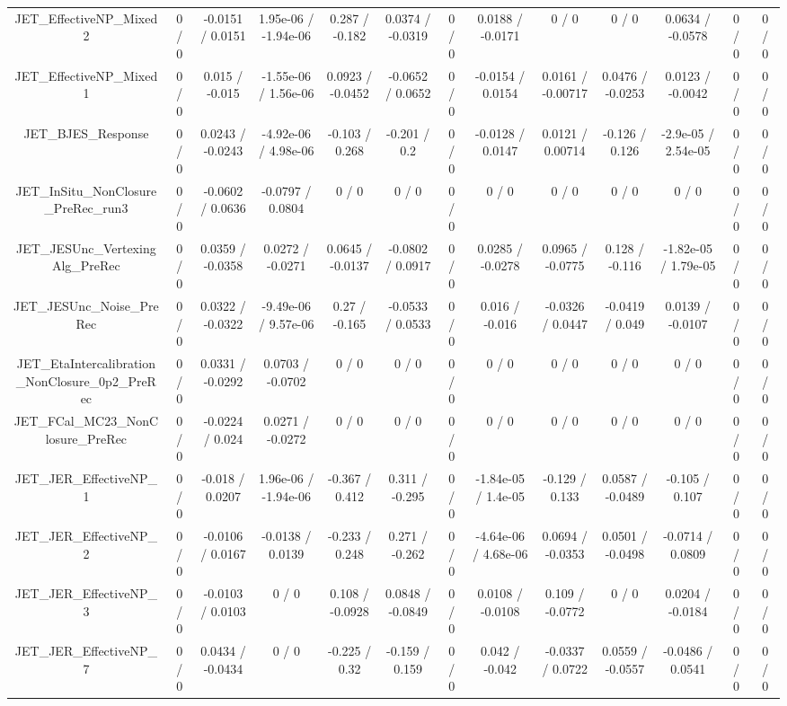 \documentclass[10pt]{article}
\begin{document}
\begin{table}[htbp]
\begin{center}
\begin{tabular}{|c|c|c|c|c|c|c|c|c|c|c|c|c|}
  JET_EffectiveNP_Mixed2 & 0 / 0 & -0.0151 / 0.0151 & 1.95e-06 / -1.94e-06 & 0.287 / -0.182 & 0.0374 / -0.0319 & 0 / 0 & 0.0188 / -0.0171 & 0 / 0 & 0 / 0 & 0.0634 / -0.0578 & 0 / 0 & 0 / 0 \\ 
  JET_EffectiveNP_Mixed1 & 0 / 0 & 0.015 / -0.015 & -1.55e-06 / 1.56e-06 & 0.0923 / -0.0452 & -0.0652 / 0.0652 & 0 / 0 & -0.0154 / 0.0154 & 0.0161 / -0.00717 & 0.0476 / -0.0253 & 0.0123 / -0.0042 & 0 / 0 & 0 / 0 \\ 
  JET_BJES_Response & 0 / 0 & 0.0243 / -0.0243 & -4.92e-06 / 4.98e-06 & -0.103 / 0.268 & -0.201 / 0.2 & 0 / 0 & -0.0128 / 0.0147 & 0.0121 / 0.00714 & -0.126 / 0.126 & -2.9e-05 / 2.54e-05 & 0 / 0 & 0 / 0 \\ 
  JET_InSitu_NonClosure_PreRec_run3 & 0 / 0 & -0.0602 / 0.0636 & -0.0797 / 0.0804 & 0 / 0 & 0 / 0 & 0 / 0 & 0 / 0 & 0 / 0 & 0 / 0 & 0 / 0 & 0 / 0 & 0 / 0 \\ 
  JET_JESUnc_VertexingAlg_PreRec & 0 / 0 & 0.0359 / -0.0358 & 0.0272 / -0.0271 & 0.0645 / -0.0137 & -0.0802 / 0.0917 & 0 / 0 & 0.0285 / -0.0278 & 0.0965 / -0.0775 & 0.128 / -0.116 & -1.82e-05 / 1.79e-05 & 0 / 0 & 0 / 0 \\ 
  JET_JESUnc_Noise_PreRec & 0 / 0 & 0.0322 / -0.0322 & -9.49e-06 / 9.57e-06 & 0.27 / -0.165 & -0.0533 / 0.0533 & 0 / 0 & 0.016 / -0.016 & -0.0326 / 0.0447 & -0.0419 / 0.049 & 0.0139 / -0.0107 & 0 / 0 & 0 / 0 \\ 
  JET_EtaIntercalibration_NonClosure_0p2_PreRec & 0 / 0 & 0.0331 / -0.0292 & 0.0703 / -0.0702 & 0 / 0 & 0 / 0 & 0 / 0 & 0 / 0 & 0 / 0 & 0 / 0 & 0 / 0 & 0 / 0 & 0 / 0 \\ 
  JET_FCal_MC23_NonClosure_PreRec & 0 / 0 & -0.0224 / 0.024 & 0.0271 / -0.0272 & 0 / 0 & 0 / 0 & 0 / 0 & 0 / 0 & 0 / 0 & 0 / 0 & 0 / 0 & 0 / 0 & 0 / 0 \\ 
  JET_JER_EffectiveNP_1 & 0 / 0 & -0.018 / 0.0207 & 1.96e-06 / -1.94e-06 & -0.367 / 0.412 & 0.311 / -0.295 & 0 / 0 & -1.84e-05 / 1.4e-05 & -0.129 / 0.133 & 0.0587 / -0.0489 & -0.105 / 0.107 & 0 / 0 & 0 / 0 \\ 
  JET_JER_EffectiveNP_2 & 0 / 0 & -0.0106 / 0.0167 & -0.0138 / 0.0139 & -0.233 / 0.248 & 0.271 / -0.262 & 0 / 0 & -4.64e-06 / 4.68e-06 & 0.0694 / -0.0353 & 0.0501 / -0.0498 & -0.0714 / 0.0809 & 0 / 0 & 0 / 0 \\ 
  JET_JER_EffectiveNP_3 & 0 / 0 & -0.0103 / 0.0103 & 0 / 0 & 0.108 / -0.0928 & 0.0848 / -0.0849 & 0 / 0 & 0.0108 / -0.0108 & 0.109 / -0.0772 & 0 / 0 & 0.0204 / -0.0184 & 0 / 0 & 0 / 0 \\ 
  JET_JER_EffectiveNP_7 & 0 / 0 & 0.0434 / -0.0434 & 0 / 0 & -0.225 / 0.32 & -0.159 / 0.159 & 0 / 0 & 0.042 / -0.042 & -0.0337 / 0.0722 & 0.0559 / -0.0557 & -0.0486 / 0.0541 & 0 / 0 & 0 / 0 \\ 

\end{tabular}
\end{center}
\end{table}
\end{document}
